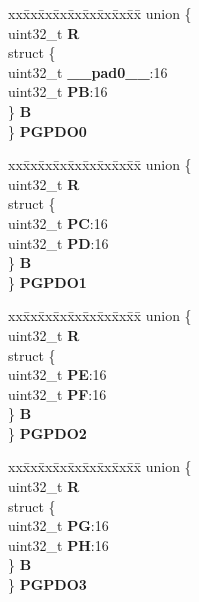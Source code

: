 \begin{DoxyCompactItemize}
\begin{tabbing}
\end{tabbing}\item 
\mbox{\label{structSIU__tag_aa8a0d52d1d483460a6e1f41353d26e3c}} 
\begin{tabbing}
xx\=xx\=xx\=xx\=xx\=xx\=xx\=xx\=xx\=\kill
union \{\\
\>uint32\_t {\bfseries R}\\
\>struct \{\\
\>\>uint32\_t {\bfseries \_\_pad0\_\_}:16\\
\>\>uint32\_t {\bfseries PB}:16\\
\>\} {\bfseries B}\\
\} {\bfseries PGPDO0}\\

\end{tabbing}\item 
\mbox{\label{structSIU__tag_a1035185d8871d192b649ffcbca927302}} 
\begin{tabbing}
xx\=xx\=xx\=xx\=xx\=xx\=xx\=xx\=xx\=\kill
union \{\\
\>uint32\_t {\bfseries R}\\
\>struct \{\\
\>\>uint32\_t {\bfseries PC}:16\\
\>\>uint32\_t {\bfseries PD}:16\\
\>\} {\bfseries B}\\
\} {\bfseries PGPDO1}\\

\end{tabbing}\item 
\mbox{\label{structSIU__tag_a072c59eb011565fc4844c3fed50e55ba}} 
\begin{tabbing}
xx\=xx\=xx\=xx\=xx\=xx\=xx\=xx\=xx\=\kill
union \{\\
\>uint32\_t {\bfseries R}\\
\>struct \{\\
\>\>uint32\_t {\bfseries PE}:16\\
\>\>uint32\_t {\bfseries PF}:16\\
\>\} {\bfseries B}\\
\} {\bfseries PGPDO2}\\

\end{tabbing}\item 
\mbox{\label{structSIU__tag_abf327aa93e82772178227b7f6ee33aa0}} 
\begin{tabbing}
xx\=xx\=xx\=xx\=xx\=xx\=xx\=xx\=xx\=\kill
union \{\\
\>uint32\_t {\bfseries R}\\
\>struct \{\\
\>\>uint32\_t {\bfseries PG}:16\\
\>\>uint32\_t {\bfseries PH}:16\\
\>\} {\bfseries B}\\
\} {\bfseries PGPDO3}\\


\end{tabbing}
\end{DoxyCompactItemize}
